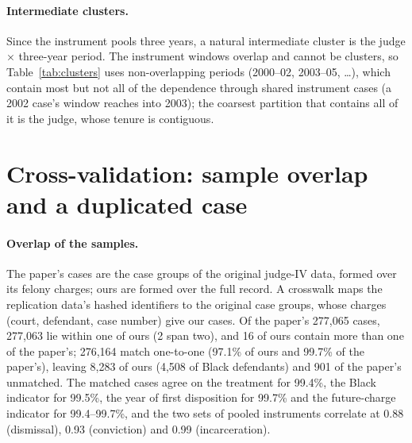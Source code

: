 \documentclass[11pt]{article}
\begin{document}
\paragraph{Intermediate clusters.} Since the instrument pools three years, a natural intermediate cluster is the judge $\times$ three-year period. The instrument windows overlap and cannot be clusters, so Table~\ref{tab:clusters} uses non-overlapping periods (2000--02, 2003--05, \ldots), which contain most but not all of the dependence through shared instrument cases (a 2002 case's window reaches into 2003); the coarsest partition that contains all of it is the judge, whose tenure is contiguous.

\section{Cross-validation: sample overlap and a duplicated case}\label{sec:crossval_details}

\paragraph{Overlap of the samples.} The paper's cases are the case groups of the original judge-IV data, formed over its felony charges; ours are formed over the full record. A crosswalk maps the replication data's hashed identifiers to the original case groups, whose charges (court, defendant, case number) give our cases. Of the paper's 277,065 cases, 277,063 lie within one of ours (2 span two), and 16 of ours contain more than one of the paper's; 276,164 match one-to-one (97.1\% of ours and 99.7\% of the paper's), leaving 8,283 of ours (4,508 of Black defendants) and 901 of the paper's unmatched. The matched cases agree on the treatment for 99.4\%, the Black indicator for 99.5\%, the year of first disposition for 99.7\% and the future-charge indicator for 99.4--99.7\%, and the two sets of pooled instruments correlate at 0.88 (dismissal), 0.93 (conviction) and 0.99 (incarceration).
\end{document}

